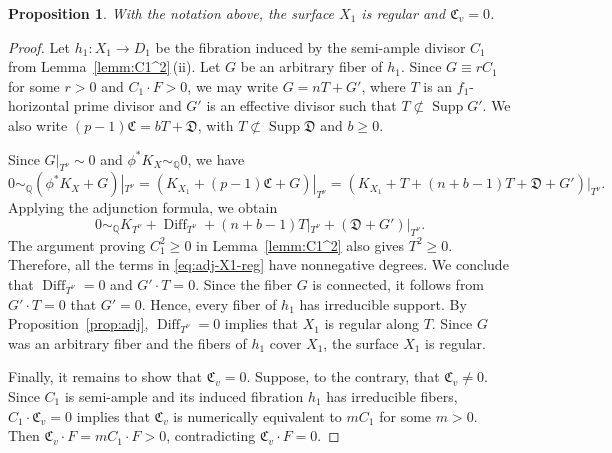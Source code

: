 \documentclass[10pt,abstract=true]{scrartcl}
\numberwithin{equation}{section}
\newtheorem{proposition}[theorem]{Proposition}
\theoremstyle{definition}
\theoremstyle{remark}
\def\simQ{\sim_{\mathbb Q}} \def\geQ{\ge_{\mathbb Q}}
\DeclareMathOperator\Supp{Supp}
\begin{document}
\begin{proposition}\label{prop:caseB-regularity}%
  With the notation above, the surface $X_1$ is regular and $\mathfrak C_v=0$.
\end{proposition}
\begin{proof}
  Let $h_1\colon X_1\to D_1$ be the fibration induced by the semi-ample divisor $C_1$ from Lemma~\ref{lemm:C1^2}\,\textup{(ii)}.
  Let $G$ be an arbitrary fiber of $h_1$. Since $G\equiv rC_1$ for some $r>0$ and $C_1\cdot F>0$, we may write $G=nT+G'$, where $T$ is an $f_1$-horizontal prime divisor and $G'$ is an effective divisor such that $T\not\subset\Supp G'$.
  We also write $(p-1)\mathfrak C=bT+\mathfrak D$, with $T\not\subset\operatorname{Supp}\mathfrak D$ and $b\ge0$.
  
  Since $G|_{T^\nu}\sim 0$ and $\phi^*K_X\simQ 0$, we have \[0\simQ (\phi^*K_X+G)|_{T^\nu}=(K_{X_1}+(p-1)\mathfrak C+G)|_{T^\nu}=(K_{X_1}+T+(n+b-1)T+\mathfrak D+G')|_{T^\nu}.\] Applying the adjunction formula, we obtain
  \begin{equation}\label{eq:adj-X1-reg}
    0\simQ K_{T^\nu}+\operatorname{Diff}_{T^\nu} +(n+b-1)T|_{T^\nu}+(\mathfrak D+G')|_{T^\nu}.
  \end{equation}
  The argument proving $C_1^2\ge 0$ in Lemma~\ref{lemm:C1^2} also gives $T^2\geq0$.
  Therefore, all the terms in \eqref{eq:adj-X1-reg} have nonnegative degrees. We conclude that
  $\operatorname{Diff}_{T^\nu}=0$ and $G'\cdot T=0$.  Since the fiber $G$ is connected, it follows from $G'\cdot T=0$ that $G'=0$. Hence, every fiber of $h_1$ has irreducible support. By Proposition~\ref{prop:adj}, $\operatorname{Diff}_{T^\nu}=0$ implies that $X_1$ is regular along $T$.
  Since $G$ was an arbitrary fiber and the fibers of $h_1$ cover $X_1$, the surface $X_1$ is regular. 
  
  Finally, it remains to show that $\mathfrak C_v=0$. Suppose, to the contrary, that $\mathfrak C_v\neq 0$. 
  Since $C_1$ is semi-ample and its induced fibration $h_1$ has irreducible fibers, $C_1\cdot \mathfrak C_v=0$ implies that $\mathfrak C_v$ is numerically equivalent to $mC_1$ for some $m>0$. Then $\mathfrak C_v\cdot F=mC_1\cdot F>0$, contradicting $\mathfrak C_v \cdot F=0$. 
  
\end{proof}
\end{document}
